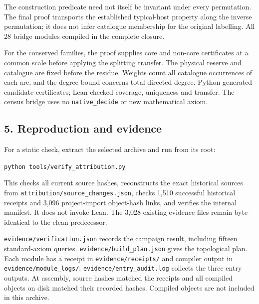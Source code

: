 \documentclass[english,11pt,a4paper]{article}
\begin{document}
The construction predicate need not itself be invariant under every permutation. The final proof transports the established typical-host property along the inverse permutation; it does not infer catalogue membership for the original labelling. All 28 bridge modules compiled in the complete closure.

For the conserved families, the proof supplies core and non-core certificates at a common scale before applying the splitting transfer. The physical reserve and catalogue are fixed before the residue. Weights count all catalogue occurrences of each arc, and the degree bound concerns total directed degree. Python generated candidate certificates; Lean checked coverage, uniqueness and transfer. The census bridge uses no \texttt{native\_\allowbreak{}decid\allowbreak{}e} or new mathematical axiom.


\subsection{5. Reproduction and evidence}\label{reproduction-and-evidence}

For a static check, extract the selected archive and run from its root:

\texttt{python tools\allowbreak{}/\allowbreak{}verify\_\allowbreak{}attr\allowbreak{}ibution.\allowbreak{}py}

This checks all current source hashes, reconstructs the exact historical sources from \texttt{attribution/\allowbreak{}\allowbreak{}source\_\allowbreak{}chang\allowbreak{}es.\allowbreak{}json}, checks 1,510 successful historical receipts and 3,096 project-import object-hash links, and verifies the internal manifest. It does not invoke Lean. The 3,028 existing evidence files remain byte-identical to the clean predecessor.

\texttt{evidence/\allowbreak{}ver\allowbreak{}ification.\allowbreak{}js\allowbreak{}on} records the campaign result, including fifteen standard-axiom queries. \texttt{evidence/\allowbreak{}bui\allowbreak{}ld\_\allowbreak{}plan.\allowbreak{}json\allowbreak{}} gives the topological plan. Each module has a receipt in \texttt{evidence/\allowbreak{}rec\allowbreak{}eipts/\allowbreak{}} and compiler output in \texttt{evidence/\allowbreak{}mod\allowbreak{}ule\_\allowbreak{}logs/\allowbreak{}}; \texttt{evidence/\allowbreak{}ent\allowbreak{}ry\_\allowbreak{}audit.\allowbreak{}log\allowbreak{}} collects the three entry outputs. At assembly, source hashes matched the receipts and all compiled objects on disk matched their recorded hashes. Compiled objects are not included in this archive.
\end{document}
